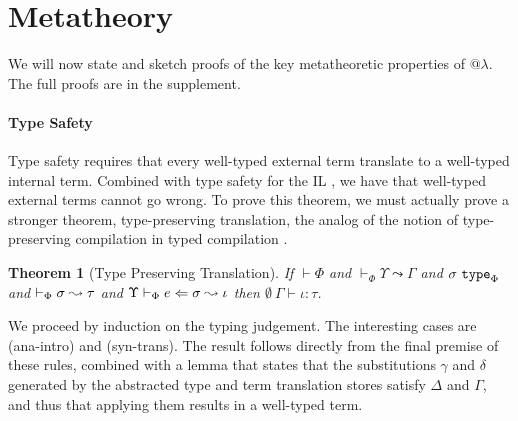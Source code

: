 \documentclass[10pt,preprint]{sigplanconf}
\newtheorem{theorem}{Theorem}
\newtheorem{lemma}{Lemma}
\newenvironment{proof-sketch}{\noindent{\emph{Proof Sketch.}}}{\qed}
\begin{document}


\section{Metatheory}\label{metatheory}
We will now state and sketch proofs of the key metatheoretic properties of @$\lambda$. The full proofs are in the supplement. 

\paragraph{Type Safety}
Type safety requires that every well-typed external term translate to a well-typed internal term. Combined with type safety for the IL \cite{pfpl}, we have that well-typed external terms cannot go wrong. To prove this theorem, we must actually prove a stronger theorem, type-preserving translation, the analog of the notion of type-preserving compilation in typed compilation \cite{tarditi+:til-OLD}.%

\begin{theorem}[Type Preserving Translation]
If $\vdash \Phi$ and $\vdash_\Phi \Upsilon \leadsto \Gamma$ and $\sigma~\texttt{type}_{\Phi}$ and $\vdash_\Phi \sigma \leadsto \tau$ and $\Upsilon \vdash_{\Phi} e \Leftarrow \sigma \leadsto \iota$ then $\emptyset~\Gamma \vdash \iota : \tau$.
\end{theorem}
\begin{proof-sketch}
We proceed by induction on the typing judgement. The interesting cases are (ana-intro) and (syn-trans). The result follows directly from the final premise of these rules, combined with a lemma that states that the substitutions $\gamma$ and $\delta$ generated by the abstracted type and term translation stores satisfy $\Delta$ and $\Gamma$, and thus that applying them results in a well-typed term.
\end{proof-sketch}
\end{document}
